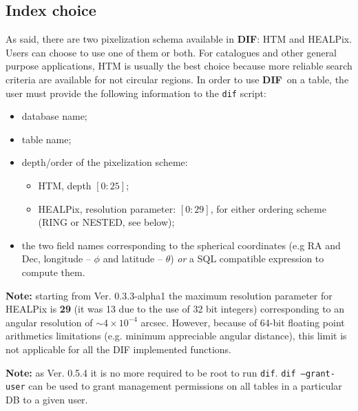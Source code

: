 \documentclass[10pt,titlepage]{article}
\newcommand{\dif}{\textbf{\small DIF}}
\begin{document}
\subsection{Index choice}
As said, there are two pixelization schema available in \dif: HTM and HEALPix.
Users can choose to use one of them or both. For catalogues and other
general purpose applications, HTM is usually
the best choice because more reliable search criteria are available for not
circular regions.
In order to use \dif\ on a table, the user must provide the following
information to the \texttt{dif} script:
%
\begin{itemize}
\item database name;
\item table name;
\item depth/order of the pixelization scheme:
  \begin{itemize}
    \item HTM, depth $[0:25]$;
    \item HEALPix, resolution parameter: $[0:29]$, for either ordering
      scheme (RING or NESTED, see below);
  \end{itemize}
\item the two field names corresponding to the spherical coordinates (e.g RA
  and Dec, longitude -- $\phi$ and latitude -- $\theta$) \emph{or} a SQL
  compatible expression to compute them.
\end{itemize}
%
\textbf{Note:} starting from Ver. 0.3.3-alpha1 the maximum
resolution parameter for HEALPix is \textbf{29} (it was 13
due to the use of 32 bit integers) corresponding to an angular resolution
of $\sim 4\times 10^{-4}$ arcsec. However, because of 64-bit floating point
arithmetics limitations (e.g. minimum appreciable angular distance),
this limit is not applicable for all the DIF implemented functions.

\textbf{Note:} as Ver. 0.5.4 it is no more required to be root to run
\texttt{dif}. \texttt{dif --grant-user} can be used to grant management permissions
on all tables in a particular DB to a given user.
\bigskip
%
\end{document}
